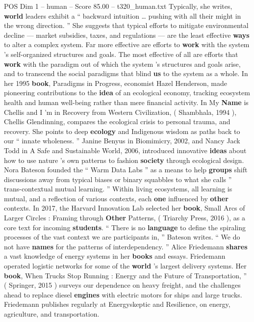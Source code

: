 \begin{textsample}{POS Dim 1 – human – Score 85.00 – t320\_human.txt}
Typically, she writes, \textbf{world} leaders exhibit a “ backward intuition … pushing with all their might in the wrong direction. ” She suggests that typical efforts to mitigate environmental decline — market subsidies, taxes, and regulations — are the least effective \textbf{ways} to alter a complex system.
Far more effective are efforts to \textbf{work} with the system ’s self-organized structures and goals.
The most effective of all are efforts that \textbf{work} with the paradigm out of which the system ’s structures and goals arise, and to transcend the social paradigms that blind \textbf{us} to the system as a whole.
In her 1995 \textbf{book}, Paradigms in Progress, economist Hazel Henderson, made pioneering contributions to the \textbf{idea} of an ecological economy, tracking ecosystem health and human well-being rather than mere financial activity.
In My \textbf{Name} is Chellis and I ’m in Recovery from Western Civilization, ( Shambhala, 1994 ), Chellis Glendinning, compares the ecological crisis to personal trauma, and recovery.
She points to deep \textbf{ecology} and Indigenous wisdom as paths back to our “ innate wholeness. ” Janine Benyus in Biomimicry, 2002, and Nancy Jack Todd in A Safe and Sustainable World, 2006, introduced innovative \textbf{ideas} about how to use nature ’s own patterns to fashion \textbf{society} through ecological design.
Nora Bateson founded the “ Warm Data Labs ” as a means to help \textbf{groups} shift discussions away from typical biases or binary squabbles to what she calls ” trans-contextual mutual learning. ” Within living ecosystems, all learning is mutual, and a reflection of various contexts, each \textbf{one} influenced by \textbf{other} contexts.
In 2017, the Harvard Innovation Lab selected her \textbf{book}, Small Arcs of Larger Circles : Framing through \textbf{Other} Patterns, ( Triarchy Press, 2016 ), as a core text for incoming \textbf{students}. “ There is no \textbf{language} to define the spiraling processes of the vast context we are participants in, ” Bateson writes. “ We do not have \textbf{names} for the patterns of interdependency. ” Alice Friedemann \textbf{shares} a vast knowledge of energy systems in her \textbf{books} and essays.
Friedemann operated logistic networks for some of the \textbf{world} ’s largest delivery systems.
Her \textbf{book}, When Trucks Stop Running : Energy and the Future of Transportation, ” ( Springer, 2015 ) surveys our dependence on heavy freight, and the challenges ahead to replace diesel \textbf{engines} with electric motors for ships and large trucks.
Friedemann publishes regularly at Energyskeptic and Resilience, on energy, agriculture, and transportation.

\end{textsample}
